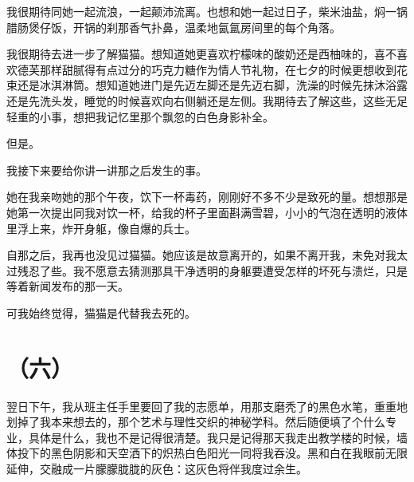 \documentclass{article}
\begin{document}
我很期待同她一起流浪，一起颠沛流离。也想和她一起过日子，柴米油盐，焖一锅腊肠煲仔饭，开锅的刹那香气扑鼻，温柔地氤氲房间里的每个角落。



我很期待去进一步了解猫猫。想知道她更喜欢柠檬味的酸奶还是西柚味的，喜不喜欢德芙那样甜腻得有点过分的巧克力糖作为情人节礼物，在七夕的时候更想收到花束还是冰淇淋筒。想知道她进门是先迈左脚还是先迈右脚，洗澡的时候先抹沐浴露还是先洗头发，睡觉的时候喜欢向右侧躺还是左侧。我期待去了解这些，这些无足轻重的小事，想把我记忆里那个飘忽的白色身影补全。



但是。



我接下来要给你讲一讲那之后发生的事。



她在我亲吻她的那个午夜，饮下一杯毒药，刚刚好不多不少是致死的量。想想那是她第一次提出同我对饮一杯，给我的杯子里面斟满雪碧，小小的气泡在透明的液体里浮上来，炸开身躯，像自爆的兵士。



自那之后，我再也没见过猫猫。她应该是故意离开的，如果不离开我，未免对我太过残忍了些。我不愿意去猜测那具干净透明的身躯要遭受怎样的坏死与溃烂，只是等着新闻发布的那一天。



可我始终觉得，猫猫是代替我去死的。





{\centering\section*{（六）}}





翌日下午，我从班主任手里要回了我的志愿单，用那支磨秃了的黑色水笔，重重地划掉了我本来想去的，那个艺术与理性交织的神秘学科。然后随便填了个什么专业，具体是什么，我也不是记得很清楚。我只是记得那天我走出教学楼的时候，墙体投下的黑色阴影和天空洒下的炽热白色阳光一同将我吞没。黑和白在我眼前无限延伸，交融成一片朦朦胧胧的灰色：这灰色将伴我度过余生。
\end{document}
